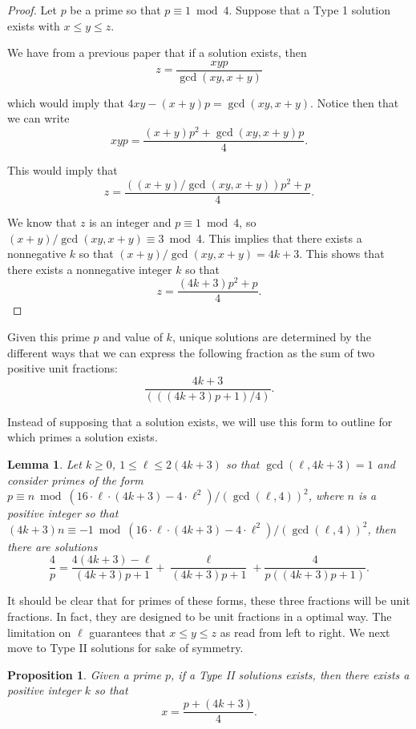 \documentclass[10pt]{article}
\newtheorem{lemma}{Lemma}
\newtheorem{proposition}{Proposition}
\theoremstyle{definition}
\begin{document}
\begin{proof}
Let $p$  be a prime so that $p \equiv 1 \bmod 4$.  Suppose that a Type 1 solution exists with $x \leq y \leq z$.

We have from a previous paper that if a solution exists, then $$z =  \frac{xyp}{\gcd(xy,x+y)}$$

\noindent which would imply that $4xy - (x+y)p = \gcd(xy,x+y)$.  Notice then that we can write $$xyp = \frac{(x+y)p^{2} + \gcd(xy, x+y)p}{4}.$$

This would imply that $$ z=\frac{\left( (x+y) \slash \gcd(xy,x+y) \right)p^{2}+p}{4}. $$

We know that $z$  is an integer and $p \equiv 1 \bmod 4$, so $(x+y) \slash \gcd(xy,x+y) \equiv 3 \bmod 4$.    This implies that there exists a nonnegative $k$  so that $(x+y) \slash \gcd(xy,x+y) = 4k+3$.  This shows that there exists a nonnegative integer $k$  so that $$  z= \frac{(4k+3)p^{2}+p}{4}.$$
\end{proof}

Given this prime $p$  and value of $k$,  unique solutions are determined by the different ways that we can express the following fraction as the sum of two positive unit fractions:  $$ \frac{4k+3}{\left( ((4k+3)p+1) \slash 4 \right)}. $$

Instead of supposing that a solution exists, we will use this form to outline for which primes a solution exists. 

\begin{lemma}
Let $k \geq 0$, $1 \leq \ell \leq 2(4k+3)$  so that $\gcd(\ell, 4k+3) = 1$  and consider primes of the form $p \equiv n \bmod (16 \cdot \ell \cdot (4k+3) - 4 \cdot \ell^{2}) \slash (\gcd(\ell,4))^{2}$,  where $n$  is a positive integer so that $(4k+3)n \equiv -1 \bmod (16 \cdot \ell \cdot (4k+3) - 4 \cdot \ell^{2}) \slash (\gcd(\ell,4))^{2}$, then there are solutions $$ \frac{4}{p} = \frac{4(4k+3)-\ell}{(4k+3)p+1} + \frac{\ell}{(4k+3)p+1}  + \frac{4}{p((4k+3)p+1)}  .$$
\end{lemma}

It should be clear that for primes of these forms, these three fractions will be unit fractions.  In fact, they are designed to be unit fractions in a optimal way.  The limitation on $\ell$  guarantees that $x \leq y \leq z$  as read from left to right.  We next move to Type II solutions for sake of symmetry.

\begin{proposition}
Given a prime $p$, if a Type II solutions exists, then there exists a positive integer $k$  so that $$  x= \frac{p+(4k+3)}{4}.$$
\end{proposition}
\end{document}
